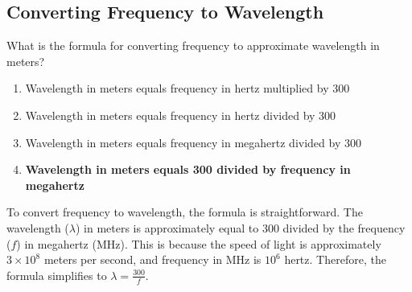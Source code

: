 \subsection{Converting Frequency to Wavelength}
\label{T3B06}

\begin{tcolorbox}[colback=gray!10!white,colframe=black!75!black,title=T3B06]
What is the formula for converting frequency to approximate wavelength in meters?
\begin{enumerate}[noitemsep]
    \item Wavelength in meters equals frequency in hertz multiplied by 300
    \item Wavelength in meters equals frequency in hertz divided by 300
    \item Wavelength in meters equals frequency in megahertz divided by 300
    \item \textbf{Wavelength in meters equals 300 divided by frequency in megahertz}
\end{enumerate}
\end{tcolorbox}

To convert frequency to wavelength, the formula is straightforward. The wavelength (\(\lambda\)) in meters is approximately equal to 300 divided by the frequency (\(f\)) in megahertz (MHz). This is because the speed of light is approximately \(3 \times 10^8\) meters per second, and frequency in MHz is \(10^6\) hertz. Therefore, the formula simplifies to \(\lambda = \frac{300}{f}\).